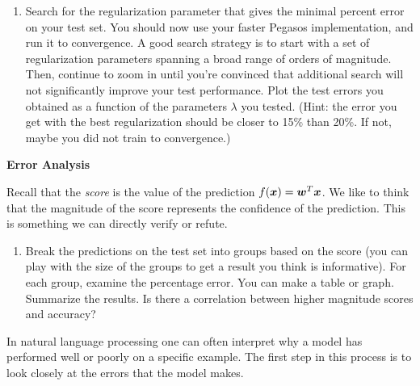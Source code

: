 \documentclass{article}
\newcommand{\nyuparagrah}[1]{\textcolor{nyupurple}{\large #1}}
\theoremstyle{plain}
\theoremstyle{definition}
\begin{document}
\begin{enumerate}
\item Search for the regularization parameter that gives the minimal percent error
on your test set. You should now use your faster Pegasos implementation,
and run it to convergence. A good search strategy is to start with
a set of regularization parameters spanning a broad range of orders
of magnitude. Then, continue to zoom in until you're convinced that
additional search will not significantly improve your test performance.
Plot the test errors you obtained as a function of the parameters $\lambda$ you tested. (Hint: the error you get with the best regularization should be closer to 15\% than 20\%. If not, maybe you did not train to convergence.)\\

\setcounter{saveenum}{\value{enumi}}
\end{enumerate}

\nyuparagrah{\bf Error Analysis}

Recall that the \emph{score} is the value of the prediction
$f(\boldsymbol{x})=\boldsymbol{w}^{T} \boldsymbol{x}$. We like to think that the magnitude of the score represents
the confidence of the prediction. This is something we can directly
verify or refute.

\begin{enumerate}
  \setcounter{enumi}{\value{saveenum}}
\item  Break the predictions on the test set into groups based on the score
(you can play with the size of the groups to get a result you think
is informative). For each group, examine the percentage error. You
can make a table or graph. Summarize the results. Is there a correlation
between higher magnitude scores and accuracy?\\


\setcounter{saveenum}{\value{enumi}}
\end{enumerate}

In natural language processing 
one can often interpret why a model has performed well or poorly on
a specific example. The
first step in this process is to look closely at the errors that the
model makes.
\end{document}
